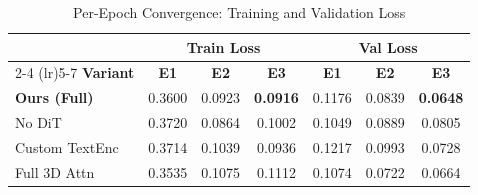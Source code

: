 \documentclass{ieeeaccess}
\begin{document}
\begin{table}[H]
    \centering
    \caption{Per-Epoch Convergence: Training and Validation Loss}
    \label{tab:convergence}
    \renewcommand{\arraystretch}{1.15}
    \begin{tabular}{@{} l ccc ccc @{}}
        \toprule
        \rowcolor{tableheader}
        & \multicolumn{3}{c}{\textbf{Train Loss}} & \multicolumn{3}{c}{\textbf{Val Loss}} \\
        \cmidrule(lr){2-4} \cmidrule(lr){5-7}
        \rowcolor{tableheader}
        \textbf{Variant} & \textbf{E1} & \textbf{E2} & \textbf{E3} & \textbf{E1} & \textbf{E2} & \textbf{E3} \\
        \midrule
        \rowcolor{tablerow1}
        \textbf{Ours (Full)} & 0.3600 & 0.0923 & \textbf{0.0916} & 0.1176 & 0.0839 & \cellcolor{bestcell}\textbf{0.0648} \\
        \rowcolor{tablerow2}
        No DiT & 0.3720 & 0.0864 & 0.1002 & 0.1049 & 0.0889 & 0.0805 \\
        \rowcolor{tablerow1}
        Custom TextEnc & 0.3714 & 0.1039 & 0.0936 & 0.1217 & 0.0993 & 0.0728 \\
        \rowcolor{tablerow2}
        Full 3D Attn & 0.3535 & 0.1075 & 0.1112 & 0.1074 & 0.0722 & 0.0664 \\
        \bottomrule
    \end{tabular}
\end{table}
\end{document}
